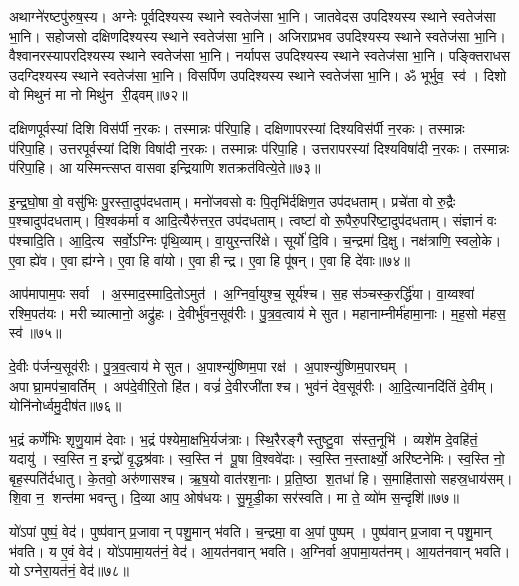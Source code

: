 अथाग्ने॑रष्टपु॑रुष॒स्य। 
अग्नेः पूर्वदिश्यस्य स्थाने स्वतेज॑सा भा॒नि। 
जातवेदस उपदिश्यस्य स्थाने स्वतेज॑सा भा॒नि। 
सहोजसो दक्षिणदिश्यस्य स्थाने स्वतेज॑सा भा॒नि। 
अजिराप्रभव उपदिश्यस्य स्थाने स्वतेज॑सा भा॒नि। 
वैश्वानरस्यापरदिश्यस्य स्थाने स्वतेज॑सा भा॒नि। 
नर्यापस उपदिश्यस्य स्थाने स्वतेज॑सा भा॒नि। 
पङ्क्तिराधस उदग्दिश्यस्य स्थाने स्वतेज॑सा भा॒नि। 
विसर्पिण उपदिश्यस्य स्थाने स्वतेज॑सा भा॒नि। 
ॐ भूर्भुव॒ स्व॑। दिशो वो मिथुनं मा नो मिथु॑न री॒ढ्वम्॥७२॥\anuvakamend


दक्षिणपूर्वस्यां दिशि विस॑र्पी न॒रकः। तस्मान्नः प॑रिपा॒हि। 
दक्षिणापरस्यां दिश्यविस॑र्पी न॒रकः। तस्मान्नः प॑रिपा॒हि। 
उत्तरपूर्वस्यां दिशि विषा॑दी न॒रकः। तस्मान्नः प॑रिपा॒हि। 
उत्तरापरस्यां दिश्यविषा॑दी न॒रकः। तस्मान्नः प॑रिपा॒हि। 
आ यस्मिन्त्सप्त वासवा इन्द्रियाणि शतक्रत॑वित्ये॒ते॥७३॥\anuvakamend


इ॒न्द्र॒घो॒षा वो॒ वसु॑भिः पु॒रस्ता॒दुप॑दधताम्‌। 
मनो॑जवसो वः पि॒तृभि॑र्दक्षिण॒त उप॑दधताम्‌। 
प्रचे॑ता वो रु॒द्रैः प॒श्चादुप॑दधताम्‌। 
वि॒श्वक॑र्मा व आदि॒त्यैरु॑त्तर॒त उप॑दधताम्‌। 
त्वष्टा॑ वो रू॒पैरु॒परि॑ष्टा॒दुप॑\-दधताम्‌। 
संज्ञानं वः प॑श्चादि॒ति। आ॒दि॒त्य सर्वो॒ऽग्निः पृ॑थि॒व्याम्‌। 
वा॒युर॒न्तरि॑क्षे। सूर्यो॑ दि॒वि। च॒न्द्रमा॑ दि॒क्षु। 
नक्ष॑त्राणि॒ स्वलो॒के। ए॒वा ह्ये॑व। ए॒वा ह्य॑ग्ने। 
ए॒वा हि वा॑यो। ए॒वा हीन्द्र। ए॒वा हि पू॑षन्‌। ए॒वा हि दे॑वाः॥७४॥\anuvakamend


आप॑मापाम॒पः सर्वा। अ॒स्माद॒स्मादि॒तोऽमुत॑।
अ॒ग्निर्वा॒युश्च॒ सूर्य॑श्च। स॒ह स॑ञ्चस्क॒रर्द्धि॑या। 
वा॒य्वश्वा॑ रश्मि॒पत॑यः। मरीच्यात्मानो॒ अद्रु॑हः। 
दे॒वीर्भु॑वन॒सूव॑रीः। पु॒त्र॒व॒त्वाय॑ मे सुत। 
महानाम्नीर्म॑हामा॒नाः। म॒ह॒सो म॑हस॒ स्व॑॥७५॥


दे॒वीः प॑र्जन्य॒सूव॑रीः। पु॒त्र॒व॒त्वाय॑ मे सुत। 
अ॒पाश्न्यु॑ष्णिम॒पा रक्ष॑। अ॒पाश्न्यु॑ष्णि\-म॒पारघम्। 
अपाघ्रा॒मप॑चा॒वर्तिम्। अप॑दे॒वीरि॒तो हि॑त। 
वज्रं॑ दे॒वीरजी॑ताश्च। भुव॑नं देव॒सूव॑रीः। 
आ॒दि॒त्यानदि॑तिं दे॒वीम्। योनि॑नोर्ध्वमु॒दीष॑त॥७६॥


भ॒द्रं कर्णे॑भिः शृणु॒याम॑ देवाः। भ॒द्रं प॑श्येमा॒क्षभि॒र्यज॑त्राः। 
स्थि॒रैरङ्गैस्तुष्टु॒वा स॑स्त॒नूभि॑। व्यशे॑म दे॒वहि॑तं॒ यदायु॑। 
स्व॒स्ति न॒ इन्द्रो॑ वृ॒द्धश्र॑वाः। स्व॒स्ति न॑ पू॒षा वि॒श्ववे॑दाः। 
स्व॒स्ति न॒स्तार्क्ष्यो॒ अरि॑ष्टनेमिः। स्व॒स्ति नो॒ बृह॒स्पति॑र्दधातु। 
के॒तवो॒ अरु॑णासश्च। ऋ॒ष॒यो वात॑रश॒नाः। 
प्र॒ति॒ष्ठा श॒तधा॑ हि। स॒माहि॑तासो सहस्र॒धाय॑सम्। 
शि॒वा न॒ शन्त॑मा भवन्तु। दि॒व्या आप॒ ओष॑धयः। 
सु॒मृ॒डी॒का सर॑स्वति। मा ते॒ व्यो॑म स॒न्दृशि॑॥७७॥\anuvakamend


यो॑ऽपां पुष्पं॒ वेद॑। पुष्प॑वान्‌ प्र॒जावान् पशु॒मान् भ॑वति। 
च॒न्द्रमा॒ वा अ॒पां पुष्पम्। पुष्प॑वान् प्र॒जावान् पशु॒मान्‌ भ॑वति। 
य ए॒वं वेद॑। यो॑ऽपामा॒यत॑नं॒ वेद॑। 
आ॒यत॑नवान्‌ भवति। अ॒ग्निर्वा अ॒पामा॒यत॑नम्। 
आ॒यत॑नवान्‌ भवति। योऽग्नेरा॒यत॑नं॒ वेद॑॥७८॥


